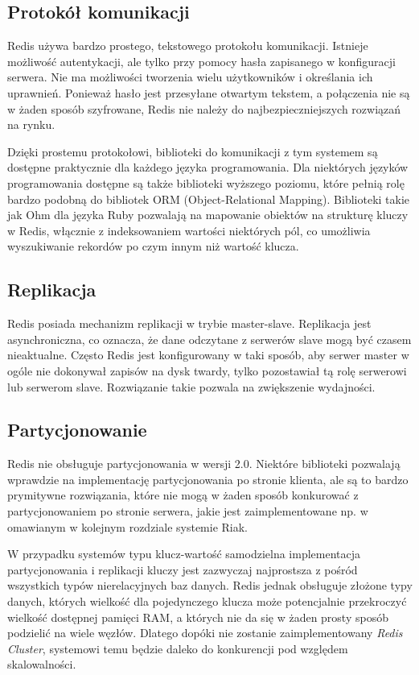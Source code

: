 \subsection*{Protokół komunikacji}

Redis używa bardzo prostego, tekstowego protokołu komunikacji.
Istnieje możliwość autentykacji, ale tylko przy pomocy hasła zapisanego w konfiguracji serwera.
Nie ma możliwości tworzenia wielu użytkowników i określania ich uprawnień.
Ponieważ hasło jest przesyłane otwartym tekstem, a połączenia nie są w żaden sposób szyfrowane, Redis nie należy do najbezpieczniejszych rozwiązań na rynku.

Dzięki prostemu protokołowi, biblioteki do komunikacji z tym systemem są dostępne praktycznie dla każdego języka programowania.
Dla niektórych języków programowania dostępne są także biblioteki wyższego poziomu, które pełnią rolę bardzo podobną do bibliotek ORM (Object-Relational Mapping).
Biblioteki takie jak Ohm dla języka Ruby pozwalają na mapowanie obiektów na strukturę kluczy w Redis, włącznie z indeksowaniem wartości niektórych pól, co umożliwia wyszukiwanie rekordów po czym innym niż wartość klucza. 

\subsection*{Replikacja}

Redis posiada mechanizm replikacji w trybie master-slave.
Replikacja jest asynchroniczna, co oznacza, że dane odczytane z serwerów slave mogą być czasem nieaktualne.
Często Redis jest konfigurowany w taki sposób, aby serwer master w ogóle nie dokonywał zapisów na dysk twardy, tylko pozostawiał tą rolę serwerowi lub serwerom slave.
Rozwiązanie takie pozwala na zwiększenie wydajności.

\subsection*{Partycjonowanie}

Redis nie obsługuje partycjonowania w wersji 2.0.
Niektóre biblioteki pozwalają wprawdzie na implementację partycjonowania po stronie klienta, ale są to bardzo prymitywne rozwiązania, które nie mogą w żaden sposób konkurować z partycjonowaniem po stronie serwera, jakie jest zaimplementowane np. w omawianym w kolejnym rozdziale systemie Riak.

W przypadku systemów typu klucz-wartość samodzielna implementacja partycjonowania i replikacji kluczy jest zazwyczaj najprostsza z pośród wszystkich typów nierelacyjnych baz danych.
Redis jednak obsługuje złożone typy danych, których wielkość dla pojedynczego klucza może potencjalnie przekroczyć wielkość dostępnej pamięci RAM, a których nie da się w żaden prosty sposób podzielić na wiele węzłów.
Dlatego dopóki nie zostanie zaimplementowany \emph{Redis Cluster}, systemowi temu będzie daleko do konkurencji pod względem skalowalności.

